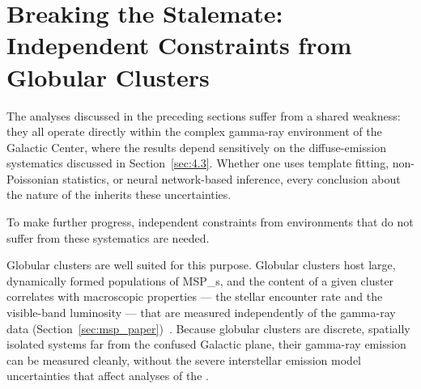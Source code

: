 
\section{Breaking the Stalemate: Independent Constraints from Globular Clusters}
\label{sec:4.4}

The analyses discussed in the preceding sections suffer from a shared weakness: they all operate directly within the complex gamma-ray environment of the Galactic Center, where the results depend sensitively on the diffuse-emission systematics discussed in Section~\ref{sec:4.3}.
Whether one uses template fitting, non-Poissonian statistics, or neural network-based inference, every conclusion about the nature of the \GCE inherits these uncertainties.

To make further progress, independent constraints from environments that do not suffer from these systematics are needed.

Globular clusters are well suited for this purpose.
Globular clusters host large, dynamically formed populations of \glspl{MSP_}, and the \MSP content of a given cluster correlates with macroscopic properties --- the stellar encounter rate and the visible-band luminosity --- that are measured independently of the gamma-ray data (Section~\ref{sec:msp_paper})~\cite{Amerio:2024qor}.
Because globular clusters are discrete, spatially isolated systems far from the confused Galactic plane, their gamma-ray emission can be measured cleanly, without the severe interstellar emission model uncertainties that affect analyses of the \GCE.

